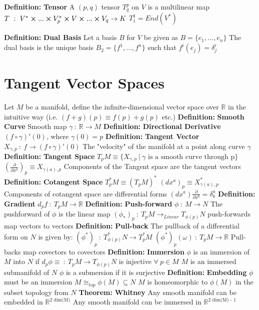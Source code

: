 \documentclass[14pt]{extarticle}
\def\Definition{{\color{blue} \textbf{Definition:} }}
\def\Theorem{{\color{red} \textbf{Theorem:} }}
\begin{document}
\begin{outline}
		\1	\Definition \textbf{Tensor}
			\2	A $(p,q)$ tensor $T^p_q$ on $V$ is a multilinear map
			\2	$T~:~V^* \cross ... \cross V^*_p \cross V \cross ... \cross V_q \rightarrow K$
			\2	$T^1_1 = End(V^*)$

		\1	\Definition \textbf{Dual Basis}
			\2	Let a basis $B$ for $V$ be given as $B = \{e_1,...,e_n\}$
			\2	The dual basis is the unique basis $B_2 = \{f^1,...,f^n\}$ such
					that $f^i(e_j) = \delta_j^i$

	\section*{Tangent Vector Spaces}
		\1	Let $M$ be a manifold, define the infinite-dimensional vector space over
				$\mathbb{R}$ in the intuitive way (i.e. $(f+g)(p) \equiv f(p) + g(p)$ etc.)
		\1	\Definition \textbf{Smooth Curve}
			\2	Smooth map $\gamma~:~\mathbb{R} \rightarrow M$
			\2	\Definition \textbf{Directional Derivative} 
				\3	$(f \circ \gamma)'(0)$, where $\gamma(0) = p$
			\2	\Definition \textbf{Tangent Vector}
				\3	$X_{\gamma,p} ~:~f \rightarrow (f \circ \gamma)'(0)$
				\3	The "velocity" of the manifold at a point along curve $\gamma$
		\1	\Definition \textbf{Tangent Space}
			\2	$T_pM \equiv \{X_{\gamma,p}~|~\gamma \text{ is a smooth curve through p}\}$
			\2	$(\frac{\partial}{\partial x^a})_p \equiv X_{\gamma(a),p}$
				\3	Components of the Tangent space are the tangent vectors
		\1	\Definition \textbf{Cotangent Space}
			\2	$T_p^*M \equiv (T_pM)^*$
			\2	$(dx^a)_p \equiv X^*_{\gamma(a),p}$
				\3	Components of cotangent space are differential forms
			\2	$(dx^a) \frac{\partial}{\partial x^b} = \delta_b^a$
		\1	\Definition \textbf{Gradient}
			\2	$d_p f~:~T_pM \rightarrow \mathbb{R}$
		\1	\Definition \textbf{Push-forward}
			\2	$\phi~:~M \rightarrow N$
			\2	The pushforward of $\phi$ is the linear map
					$(\phi_*)_p~:~T_pM \rightarrow_{Linear} T_{\phi(p)}N$
			\2	push-forwards map vectors to vectors
		\1	\Definition \textbf{Pull-back}
			\2	The pullback of a differential form on $N$ is given by:
				\3	$(\phi^*)_p ~:~T^*_{\phi(p)}N \rightarrow T_p^*M$
				\3	$(\phi^*)_p(\omega)~:~T_pM \rightarrow \mathbb{R}$
			\2	Pull-backs map covectors to covectors
		\1	\Definition \textbf{Immersion}
			\2	$\phi$ is an immersion of $M$ into $N$ if $d_p\phi \equiv ~:~T_pM \rightarrow T_{\phi(p)}N$
					is injective $\forall~p \in M$
			\2	$M$ is an immersed submanifold of $N$
			\2	$\phi$ is a submersion if it is surjective
		\1	\Definition \textbf{Embedding}
			\2	$\phi$ must be an immersion
			\2	$M \cong_{top} \phi(M) \subseteq N$
			\2	$M$ is homeomorphic to $\phi(M)$ in the subset topology from $N$	
		\1	\Theorem \textbf{Whitney}
			\2	Any smooth manifold can be embedded in $\mathbb{R}^{\text{2 dim(M)}}$
			\2	Any smooth manifold can be immersed in $\mathbb{R}^{\text{2 dim(M) - 1}}$
		
		\end{outline}
\end{document}
